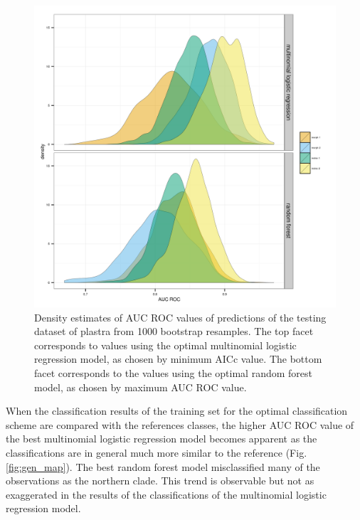 \documentclass[12pt]{article}\usepackage{graphicx, color}
\begin{document}
\begin{figure}[ht]
  \centering
  \includegraphics[width = \textwidth]{figure/gen_res}
  \caption{Density estimates of AUC ROC values of predictions of the testing dataset of plastra from 1000 bootstrap resamples. The top facet corresponds to values using the optimal multinomial logistic regression model, as chosen by minimum AICc value. The bottom facet corresponds to the values using the optimal random forest model, as chosen by maximum AUC ROC value.}
  \label{fig:gen_res}
\end{figure}

When the classification results of the training set for the optimal classification scheme are compared with the references classes, the higher AUC ROC value of the best multinomial logistic regression model becomes apparent as the classifications are in general much more similar to the reference (Fig. \ref{fig:gen_map}). The best random forest model misclassified many of the observations as the northern clade. This trend is observable but not as exaggerated in the results of the classifications of the multinomial logistic regression model.
\end{document}
